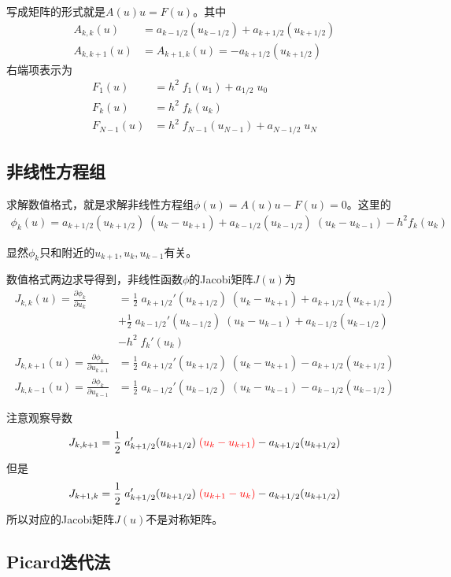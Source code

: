 \documentclass[12pt,a4paper]{article}
\begin{document}
写成矩阵的形式就是$A(u) u = F(u)$。其中
\begin{align*}
A_{k,k}(u) &= a_{k-1/2}(u_{k-1/2}) + a_{k+1/2}(u_{k+1/2}) \\
A_{k,k+1}(u) &= A_{k+1,k}(u) = -a_{k+1/2}(u_{k+1/2})
\end{align*}
右端项表示为
\begin{align*}
F_{1}(u) &= h^2 \; f_1(u_1) + a_{1/2} \; u_0 \\
F_{k}(u) &= h^2 \; f_{k}(u_{k}) \\
F_{N-1}(u) &= h^2 \; f_{N-1}(u_{N-1}) + a_{N-1/2} \; u_N
\end{align*}

\subsection*{非线性方程组}

求解数值格式，就是求解非线性方程组$\phi(u) = A(u) u - F(u) = 0$。这里的
\begin{align*}
\phi_{k}(u) = a_{k+1/2}(u_{k+1/2}) \; (u_{k} - u_{k+1}) + a_{k-1/2}(u_{k-1/2}) \; (u_{k} - u_{k-1}) - h^2 f_{k}(u_{k})
\end{align*}

显然$\phi_{k}$只和附近的$u_{k+1}, u_{k}, u_{k-1}$有关。

数值格式两边求导得到，非线性函数$\phi$的Jacobi矩阵$J(u)$为
\begin{align*}
J_{k,k}(u) = \frac{\partial \phi_{k}}{\partial u_{k}} & = \frac12 \; a_{k+1/2}'(u_{k+1/2}) \; (u_{k} - u_{k+1}) + a_{k+1/2}(u_{k+1/2}) \\
& + \frac12 \; a_{k-1/2}'(u_{k-1/2}) \; (u_{k} - u_{k-1}) + a_{k-1/2}(u_{k-1/2}) \\
& - h^2 \; f_{k}'(u_{k}) \\
J_{k,k+1}(u) = \frac{\partial \phi_{k}}{\partial u_{k+1}} & = \frac12 \; a_{k+1/2}'(u_{k+1/2}) \; (u_{k} - u_{k+1}) - a_{k+1/2}(u_{k+1/2}) \\
J_{k,k-1}(u) = \frac{\partial \phi_{k}}{\partial u_{k-1}} & = \frac12 \; a_{k-1/2}'(u_{k-1/2}) \; (u_{k} - u_{k-1}) - a_{k-1/2}(u_{k-1/2})
\end{align*}

注意观察导数
$$ J_{k,k+1} = \frac12 \; a_{k+1/2}'(u_{k+1/2}) \; {\color{red} (u_{k} - u_{k+1})} - a_{k+1/2}(u_{k+1/2}) $$
但是
$$ J_{k+1,k} = \frac12 \; a_{k+1/2}'(u_{k+1/2}) \; {\color{red} (u_{k+1} - u_{k})} - a_{k+1/2}(u_{k+1/2}) $$
所以对应的Jacobi矩阵$J(u)$不是对称矩阵。

\subsection*{Picard迭代法}
\end{document}
